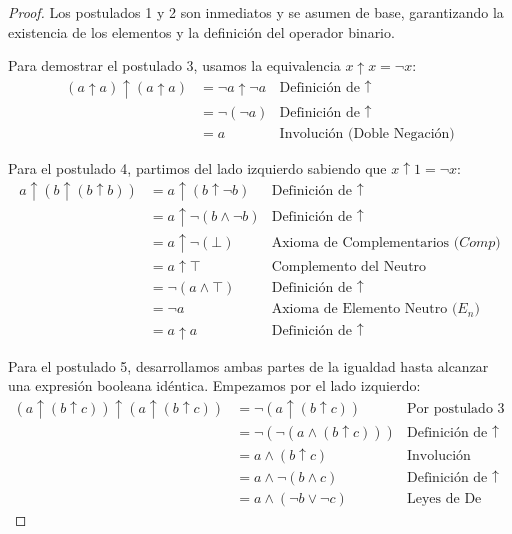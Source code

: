 \begin{proof}
Los postulados 1 y 2 son inmediatos y se asumen de base, garantizando la existencia de los elementos y la definición del operador binario.

Para demostrar el postulado 3, usamos la equivalencia $x \uparrow x = \neg x:$
\begin{align*}
(a \uparrow a) \uparrow (a \uparrow a) &= \neg a \uparrow \neg a & \text{Definición de } \uparrow \\
&= \neg (\neg a) & \text{Definición de } \uparrow \\
&= a & \text{Involución (Doble Negación)}
\end{align*}

Para el postulado 4, partimos del lado izquierdo sabiendo que $x \uparrow 1 = \neg x:$
\begin{align*}
a \uparrow (b \uparrow (b \uparrow b)) &= a \uparrow (b \uparrow \neg b) & \text{Definición de } \uparrow \\
&= a \uparrow \neg (b \wedge \neg b) & \text{Definición de } \uparrow \\
&= a \uparrow \neg (\bot) & \text{Axioma de Complementarios ($Comp$)} \\
&= a \uparrow \top & \text{Complemento del Neutro} \\
&= \neg (a \wedge \top) & \text{Definición de } \uparrow \\
&= \neg a & \text{Axioma de Elemento Neutro ($E_n$)} \\
&= a \uparrow a & \text{Definición de } \uparrow
\end{align*}

Para el postulado 5, desarrollamos ambas partes de la igualdad hasta alcanzar una expresión booleana idéntica. Empezamos por el lado izquierdo:
\begin{align*}
(a \uparrow (b \uparrow c)) \uparrow (a \uparrow (b \uparrow c)) &= \neg (a \uparrow (b \uparrow c)) & \text{Por postulado 3} \\
&= \neg (\neg (a \wedge (b \uparrow c))) & \text{Definición de } \uparrow \\
&= a \wedge (b \uparrow c) & \text{Involución} \\
&= a \wedge \neg (b \wedge c) & \text{Definición de } \uparrow \\
&= a \wedge (\neg b \vee \neg c) & \text{Leyes de De Morgan}
\end{align*}


\end{proof}
